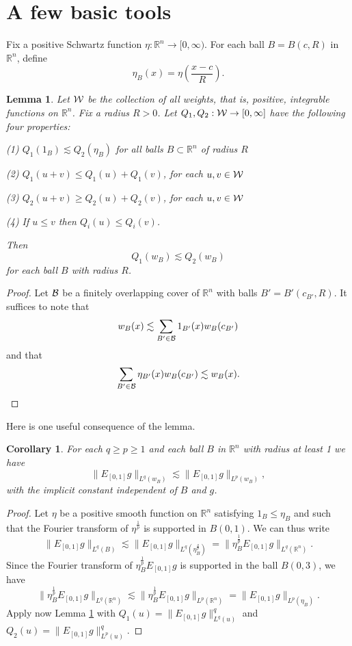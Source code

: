 \documentclass[amssymb,amsfonts,12pt]{amsart}
\newtheorem{lemma}[theorem]{Lemma}
\newtheorem{corollary}[theorem]{Corollary}
\def\R{{\mathbb R}}
\begin{document}
\bigskip






\section{A few basic tools}


Fix a positive Schwartz function $\eta:\R^n\to[0,\infty)$. For each ball $B=B(c,R)$ in $\R^n$, define
$$\eta_B(x)=\eta(\frac{x-c}{R}).$$
\begin{lemma}
\label{nl9}
Let ${\mathcal W}$ be the collection of all weights, that is, positive, integrable functions on $\R^n$. Fix a radius $R>0$.
Let $Q_1,Q_2:{\mathcal W}\to[0,\infty]$ have the following four properties:

(1) $Q_1(1_B)\lesssim Q_2(\eta_B)$ for all balls $B\subset \R^n$ of radius $R$

(2) $Q_1(u+v)\le Q_1(u)+Q_1(v)$, for each $u,v\in{\mathcal W}$

(3) $Q_2(u+v)\ge Q_2(u)+Q_2(v)$, for each $u,v\in{\mathcal W}$

(4) If $u\le v$ then $Q_i(u)\le Q_i(v)$.


Then $$Q_1(w_B)\lesssim Q_2(w_B)$$
for each ball $B$ with radius $R$.
\end{lemma}
\begin{proof}
Let ${\mathcal B}$ be a finitely overlapping cover of $\R^n$ with balls $B'=B'(c_{B'},R)$.
It suffices to note that
$$w_B(x)\lesssim \sum_{B'\in{\mathcal B}}1_{B'}(x)w_B(c_{B'})$$
and that
$$\sum_{B'\in{\mathcal B}}\eta_{B'}(x)w_B(c_{B'})\lesssim w_B(x).$$
\end{proof}
Here is one useful consequence of the lemma.
\begin{corollary}
For each $q\ge p\ge 1$ and each ball $B$ in $\R^n$ with radius at least 1 we have
\begin{equation}
\label{ nghbugtrt90g0-er9t-9}
\|E_{[0,1]}g\|_{L^q(w_B)}\lesssim \|E_{[0,1]}g\|_{L^p(w_B)},
\end{equation}
with the implicit constant independent of $B$ and $g$.
\end{corollary}
\begin{proof}
Let $\eta$ be a positive smooth function on $\R^n$  satisfying $1_B\le \eta_B$ and such that the Fourier transform of $\eta^{\frac1p}$ is  supported in $B(0,1)$.
We can thus write
$$\|E_{[0,1]}g\|_{L^q(B)}\lesssim \|E_{[0,1]}g\|_{L^q(\eta_B^{\frac{q}{p}})}=\|\eta_B^{\frac1p}E_{[0,1]}g\|_{L^q(\R^n)}.$$
Since the Fourier transform of $\eta_B^{\frac1p}E_{[0,1]}g$ is supported in the ball $B(0,3)$, we have
$$\|\eta_B^{\frac1p}E_{[0,1]}g\|_{L^q(\R^n)}\lesssim \|\eta_B^{\frac1p}E_{[0,1]}g\|_{L^p(\R^n)}=\|E_{[0,1]}g\|_{L^p(\eta_B)}.$$
Apply now Lemma \ref{nl9} with $Q_1(u)=\|E_{[0,1]}g\|_{L^q(u)}^q$ and $Q_2(u)=\|E_{[0,1]}g\|_{L^p(u)}^q$.

\end{proof}
\end{document}
